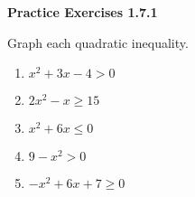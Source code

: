 \noindent\textbf{Practice Exercises 1.7.1}


Graph each quadratic inequality. 

\begin{multicols}{2}
\begin{enumerate}[label = \color{blue}\arabic*. ]
\item $ x^{2} + 3x - 4 > 0 $
\item $ 2x^{2} - x \geq 15 $
\item $ x^{2} + 6x \leq 0 $
\item $ 9 - x^{2} > 0 $
\item $ -x^{2} + 6x + 7 \geq 0 $
\end{enumerate}
\end{multicols} 
